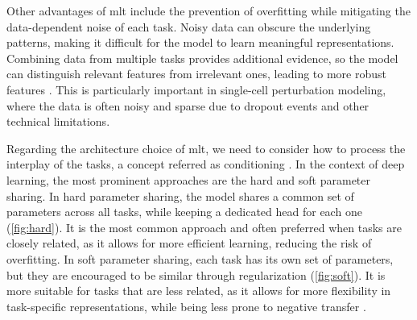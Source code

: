 \documentclass[12pt, a4paper]{article}
\begin{document}
Other advantages of \gls{mlt} include the prevention of overfitting while mitigating the data-dependent noise of each task. Noisy data can obscure the underlying patterns, making it difficult for the model to learn meaningful representations. Combining data from multiple tasks provides additional evidence, so the model can distinguish relevant features from irrelevant ones, leading to more robust features \cite{ruderOverviewMultiTaskLearning2017}. This is particularly important in single-cell perturbation modeling, where the data is often noisy and sparse due to dropout events and other technical limitations. 

Regarding the architecture choice of \gls{mlt}, we need to consider how to process the interplay of the tasks, a concept referred as conditioning \cite{dumoulin2018feature-wise}. In the context of deep learning, the most prominent approaches are the hard and soft parameter sharing. In hard parameter sharing, the model shares a common set of parameters across all tasks, while keeping a dedicated head for each one (\cref{fig:hard}). It is the most common approach and often preferred when tasks are closely related, as it allows for more efficient learning, reducing the risk of overfitting. In soft parameter sharing, each task has its own set of parameters, but they are encouraged to be similar through regularization (\cref{fig:soft}). It is more suitable for tasks that are less related, as it allows for more flexibility in task-specific representations, while being less prone to negative transfer \cite{ruderOverviewMultiTaskLearning2017}.
\end{document}
